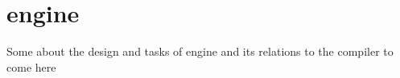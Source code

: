 \section{\langname{} engine}
Some about the design and tasks of engine and its relations to the compiler to come here